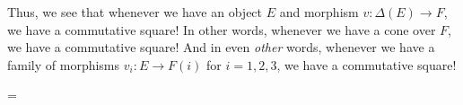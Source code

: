     Thus, we see that whenever we have an object $E$ and morphism
    $v:\Delta(E) \to F$, we have a commutative square! In other words,
    whenever we have a cone over $F$, we have a commutative square! And
    in even \textit{other} words, whenever we have a family of
    morphisms $v_i: E \to F(i)$ for $i=1,2,3$, we have a commutative
    square! 
    \begin{center}
    = 
    \end{center}    

